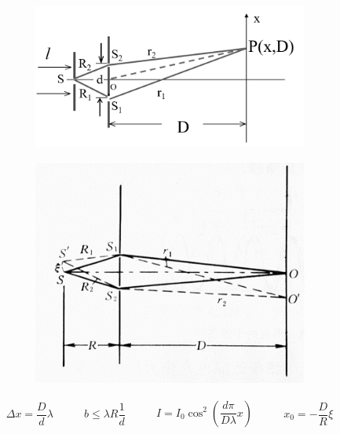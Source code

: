 \begin{figure}[H]
  \centering
  \begin{subfigure}{.55\textwidth}
    \centering
    \includegraphics[width=\linewidth]{figures/Young-Exp}
  \end{subfigure}
  \begin{subfigure}{.35\textwidth}
    \centering
    \includegraphics[width=\linewidth]{figures/Young-Exp-2}
  \end{subfigure}
\end{figure}

\begin{equation*}
  \begin{aligned}
    \Delta x = \dfrac{D}{d} \lambda 
  \end{aligned}
  \quad\quad 
  \begin{aligned}
    b \leq \lambda R \dfrac{1}{d} 
  \end{aligned}
  \quad\quad 
  \begin{aligned}
    I = I_0 \cos^2 \left( \dfrac{d \pi}{D \lambda} x  \right)
  \end{aligned}
  \quad\quad 
  \begin{aligned}
    x_0 = - \dfrac{D}{R} \xi
  \end{aligned}
\end{equation*}

